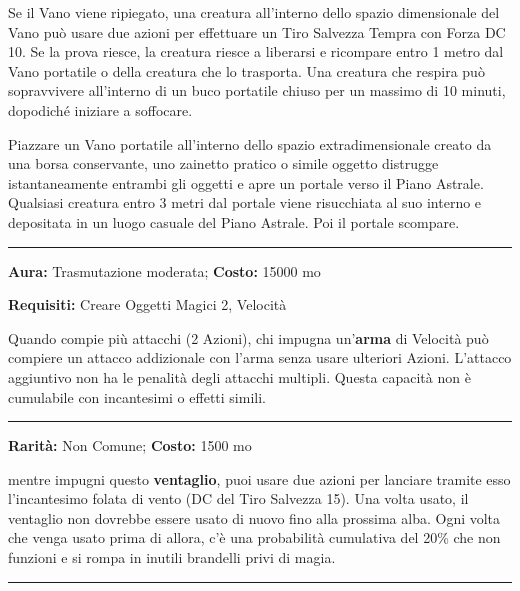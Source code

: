 \begin{multicols}{2}
Se il Vano viene ripiegato, una creatura all'interno dello spazio dimensionale del Vano può usare due azioni per effettuare un Tiro Salvezza Tempra con Forza DC 10. Se la prova riesce, la creatura riesce a liberarsi e ricompare entro 1 metro dal Vano portatile o della creatura che lo trasporta. Una creatura che respira può sopravvivere all'interno di un buco portatile chiuso per un massimo di 10 minuti, dopodiché iniziare a soffocare.

Piazzare un Vano portatile all'interno dello spazio extradimensionale creato da una borsa conservante, uno zainetto pratico o simile oggetto distrugge istantaneamente entrambi gli oggetti e apre un portale verso il Piano Astrale. Qualsiasi creatura entro 3 metri dal portale viene risucchiata al suo interno e depositata in un luogo casuale del Piano Astrale. Poi il portale scompare.

\smallskip\noindent\rule{\linewidth}{2pt}  \hypertarget{armaVelocità}{}\smallskip{}\noindent\label{armaVelocità}

\textbf{Aura:} Trasmutazione moderata; \textbf{Costo:} 15000 mo

\textbf{Requisiti:} Creare Oggetti Magici 2, Velocità

Quando compie più attacchi (2 Azioni), chi impugna un'\textbf{arma} di Velocità può compiere un attacco addizionale con l'arma senza usare ulteriori Azioni. L'attacco aggiuntivo non ha le penalità degli attacchi multipli. Questa capacità non è cumulabile con incantesimi o effetti simili.

\smallskip\noindent\rule{\linewidth}{2pt}  \hypertarget{VentaglioArcano}{}\smallskip{}\noindent\label{VentaglioArcano}

\textbf{Rarità:} Non Comune; \textbf{Costo:} 1500 mo

mentre impugni questo \textbf{ventaglio}, puoi usare due azioni per lanciare tramite esso l'incantesimo folata di vento (DC del Tiro Salvezza 15). Una volta usato, il ventaglio
non dovrebbe essere usato di nuovo fino alla prossima alba. Ogni volta che venga usato prima di allora, c'è una probabilità cumulativa del 20\% che non funzioni e si rompa in inutili brandelli privi di magia.

\smallskip\noindent\rule{\linewidth}{2pt}  \hypertarget{VergadelColpopossente}{}\smallskip{}\noindent\label{VergadelColpopossente}


\end{multicols}

